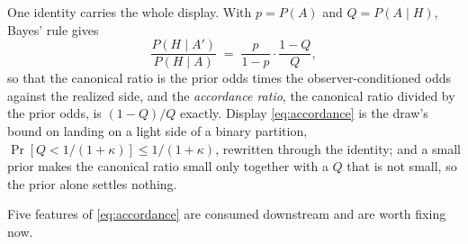 \documentclass[11pt]{article}
\theoremstyle{definition}
\begin{document}

One identity carries the whole display. With $p = P(A)$ and $Q = P(A \mid H)$, Bayes' rule gives
\begin{equation}
\label{eq:canonical-identity}
\frac{P(H \mid A')}{P(H \mid A)} \;=\; \frac{p}{1-p} \cdot \frac{1-Q}{Q},
\end{equation}
so that the canonical ratio is the prior odds times the observer-conditioned odds against the realized side, and the \emph{accordance ratio}, the canonical ratio divided by the prior odds, is $(1-Q)/Q$ exactly. Display \eqref{eq:accordance} is the draw's bound on landing on a light side of a binary partition, $\Pr[Q < 1/(1+\kappa)] \le 1/(1+\kappa)$, rewritten through the identity; and a small prior makes the canonical ratio small only together with a $Q$ that is not small, so the prior alone settles nothing.

Five features of \eqref{eq:accordance} are consumed downstream and are worth fixing now.
\end{document}
